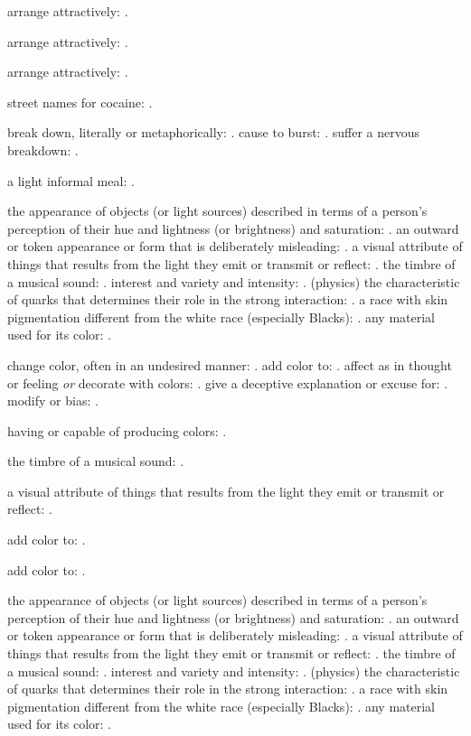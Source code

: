   arrange attractively: .

  arrange attractively: .

  arrange attractively: .

  street names for cocaine: .

  break down, literally or metaphorically: . cause to burst: . suffer a nervous breakdown: .

  a light informal meal: .

  the appearance of objects (or light sources) described in terms of a person's perception of their hue and lightness (or brightness) and saturation: . an outward or token appearance or form that is deliberately misleading: . a visual attribute of things that results from the light they emit or transmit or reflect: . the timbre of a musical sound: . interest and variety and intensity: . (physics) the characteristic of quarks that determines their role in the strong interaction: . a race with skin pigmentation different from the white race (especially Blacks): . any material used for its color: .

  change color, often in an undesired manner: . add color to: . affect as in thought or feeling \textit{or} decorate with colors: . give a deceptive explanation or excuse for: . modify or bias: .

  having or capable of producing colors: .

  the timbre of a musical sound: .

  a visual attribute of things that results from the light they emit or transmit or reflect: .

  add color to: .

  add color to: .

  the appearance of objects (or light sources) described in terms of a person's perception of their hue and lightness (or brightness) and saturation: . an outward or token appearance or form that is deliberately misleading: . a visual attribute of things that results from the light they emit or transmit or reflect: . the timbre of a musical sound: . interest and variety and intensity: . (physics) the characteristic of quarks that determines their role in the strong interaction: . a race with skin pigmentation different from the white race (especially Blacks): . any material used for its color: .

